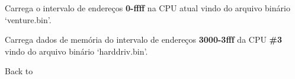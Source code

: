\documentclass[letterpaper,10pt,brazil]{sphinxmanual}
\begin{document}
\begin{DUlineblock}{0em}
\item[]
\begin{DUlineblock}{\DUlineblockindent}
\item[] 
\item[] 
\end{DUlineblock}
\item[] Carrega o intervalo de endereços \textbf{0-ffff} na CPU atual vindo do arquivo binário `venture.bin'.
\item[] 
\item[]
\begin{DUlineblock}{\DUlineblockindent}
\item[] 
\item[] 
\end{DUlineblock}
\item[] Carrega dados de memória do intervalo de endereços \textbf{3000-3fff} da CPU \textbf{\#3} vindo do arquivo binário `harddriv.bin'.
\item[] 
\item[] Back to {\hyperref[debugger/memory:debugger\string-memory\string-list]{}}
\end{DUlineblock}
\begin{quote}
\label{debugger/memory:debugger-command-map}\end{quote}
\end{document}
